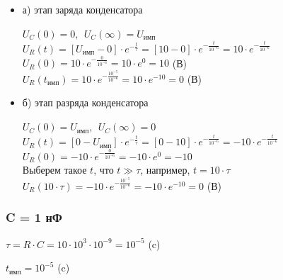 \begin{itemize}
\item[] а) этап заряда конденсатора

		$U_C(0)	= 0,\ \ U_C(\infty) = U_\text{имп}$\\
		$U_R(t) = [U_\text{имп} - 0] \cdot e^{-\frac{t}{\tau}} = [10 - 0] \cdot e^{-\frac{t}{10^{-6}}} = 10 \cdot e^{-\frac{t}{10^{-6}}}$\\
		$U_R(0) = 10 \cdot e^{-\frac{0}{10^{-6}}} = 10 \cdot e^0 = 10$ (В)\\
		$U_R(t_\text{имп}) = 10 \cdot e^{-\frac{10^{-5}}{10^{-6}}} = 10 \cdot e^{-10} = 0$ (В)\\

\item[] б) этап разряда конденсатора
		
		$U_C(0)	= U_\text{имп},\ \ U_C(\infty) = 0$\\		
		$U_R(t) = [0 - U_\text{имп}] \cdot e^{-\frac{t}{\tau}} = [0 - 10] \cdot e^{-\frac{t}{10^{-6}}} = -10 \cdot e^{-\frac{t}{10^{-6}}}$\\
		$U_R(0) = -10 \cdot e^{-\frac{0}{10^{-6}}} = -10 \cdot e^0 = -10$\\
		Выберем такое $t$, что $t \gg \tau$, например, $t = 10 \cdot \tau$ \\
		$U_R(10 \cdot \tau) = -10 \cdot e^{-\frac{10^{-5}}{10^{-6}}} = -10 \cdot e^{-10} = 0$ (В)\\
		
\end{itemize}

\subsubsection{C = 1 нФ}

		$\tau = R \cdot C = 10 \cdot 10^3 \cdot 10^{-9} = 10^{-5}$ (c)
		
		$t_\text{имп} = 10^{-5}$ (c)

